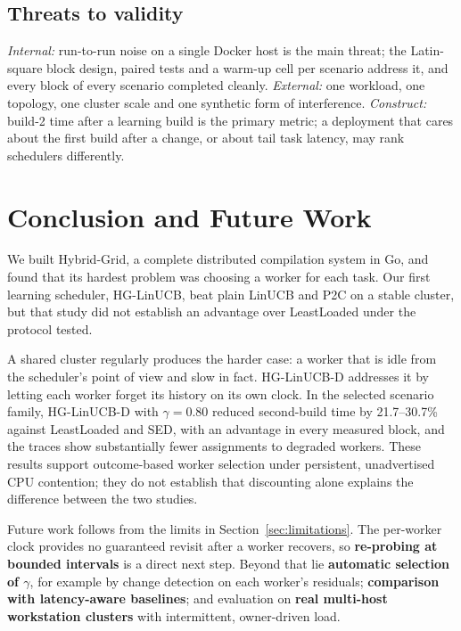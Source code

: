 \documentclass[final,5p,times,twocolumn]{elsarticle}
\begin{document}
\subsection{Threats to validity}

\emph{Internal:} run-to-run noise on a single Docker host is the main threat; the Latin-square block design, paired tests and a warm-up cell per scenario address it, and every block of every scenario completed cleanly. \emph{External:} one workload, one topology, one cluster scale and one synthetic form of interference. \emph{Construct:} build-2 time after a learning build is the primary metric; a deployment that cares about the first build after a change, or about tail task latency, may rank schedulers differently.

\section{Conclusion and Future Work}
\label{sec:conclusion}

We built Hybrid-Grid, a complete distributed compilation system in Go, and found that its hardest problem was choosing a worker for each task. Our first learning scheduler, HG-LinUCB, beat plain LinUCB and P2C on a stable cluster, but that study did not establish an advantage over LeastLoaded under the protocol tested.

A shared cluster regularly produces the harder case: a worker that is idle from the scheduler's point of view and slow in fact. HG-LinUCB-D addresses it by letting each worker forget its history on its own clock. In the selected scenario family, HG-LinUCB-D with $\gamma=0.80$ reduced second-build time by 21.7--30.7\% against LeastLoaded and SED, with an advantage in every measured block, and the traces show substantially fewer assignments to degraded workers. These results support outcome-based worker selection under persistent, unadvertised CPU contention; they do not establish that discounting alone explains the difference between the two studies.

Future work follows from the limits in Section~\ref{sec:limitations}. The per-worker clock provides no guaranteed revisit after a worker recovers, so \textbf{re-probing at bounded intervals} is a direct next step. Beyond that lie \textbf{automatic selection of $\gamma$}, for example by change detection on each worker's residuals; \textbf{comparison with latency-aware baselines}; and evaluation on \textbf{real multi-host workstation clusters} with intermittent, owner-driven load.
\end{document}

